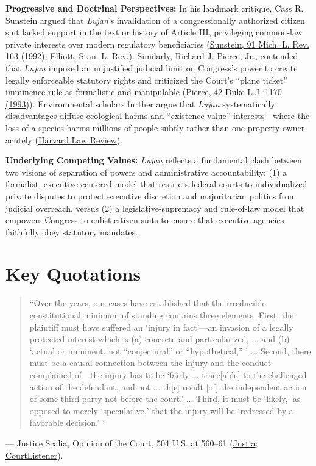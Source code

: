 \documentclass[12pt]{article}
\begin{document}
\textbf{Progressive and Doctrinal Perspectives:} In his landmark critique, Cass R. Sunstein argued that \textit{Lujan}'s invalidation of a congressionally authorized citizen suit lacked support in the text or history of Article III, privileging common-law private interests over modern regulatory beneficiaries (\href{https://chicagounbound.uchicago.edu/context/journal_articles/article/12523/viewcontent/1458.pdf}{Sunstein, 91 Mich. L. Rev. 163 (1992)}; \href{https://scholarship.law.ua.edu/cgi/viewcontent.cgi?article=1107&context=fac_articles}{Elliott, Stan. L. Rev.}). Similarly, Richard J. Pierce, Jr., contended that \textit{Lujan} imposed an unjustified judicial limit on Congress's power to create legally enforceable statutory rights and criticized the Court's ``plane ticket'' imminence rule as formalistic and manipulable (\href{https://scholarship.law.duke.edu/cgi/viewcontent.cgi?article=3222&context=dlj}{Pierce, 42 Duke L.J. 1170 (1993)}). Environmental scholars further argue that \textit{Lujan} systematically disadvantages diffuse ecological harms and ``existence-value'' interests---where the loss of a species harms millions of people subtly rather than one property owner acutely (\href{https://harvardlawreview.org/print/vol-129/existence-value-standing/}{Harvard Law Review}).

\textbf{Underlying Competing Values:} \textit{Lujan} reflects a fundamental clash between two visions of separation of powers and administrative accountability: (1) a formalist, executive-centered model that restricts federal courts to individualized private disputes to protect executive discretion and majoritarian politics from judicial overreach, versus (2) a legislative-supremacy and rule-of-law model that empowers Congress to enlist citizen suits to ensure that executive agencies faithfully obey statutory mandates.

\section{Key Quotations}
\begin{quote}
``Over the years, our cases have established that the irreducible constitutional minimum of standing contains three elements. First, the plaintiff must have suffered an `injury in fact'---an invasion of a legally protected interest which is (a) concrete and particularized, ... and (b) `actual or imminent, not ``conjectural'' or ``hypothetical,'' ' ... Second, there must be a causal connection between the injury and the conduct complained of---the injury has to be `fairly ... trace[able] to the challenged action of the defendant, and not ... th[e] result [of] the independent action of some third party not before the court.' ... Third, it must be `likely,' as opposed to merely `speculative,' that the injury will be `redressed by a favorable decision.' ''
\end{quote}
\noindent --- Justice Scalia, Opinion of the Court, 504 U.S. at 560--61 (\href{https://supreme.justia.com/cases/federal/us/504/555/}{Justia}; \href{https://www.courtlistener.com/opinion/112747/lujan-v-defenders-of-wildlife/}{CourtListener}).
\end{document}
